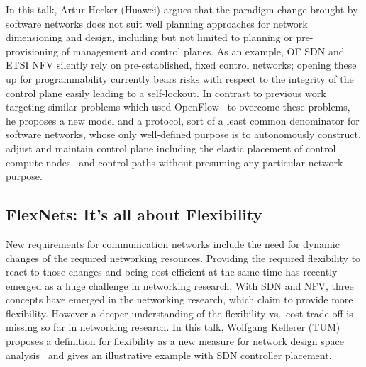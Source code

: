 In this talk, Artur Hecker (Huawei) argues that the paradigm change brought by
software networks does not suit well planning approaches for network
dimensioning and design, including but not limited to planning or
pre-provisioning of management and control planes. As an example, OF \ac{SDN}
and ETSI \ac{NFV} silently rely on pre-established, fixed control networks;
opening these up for programmability currently bears risks
\cite{lschiff:dsn:2016} with respect to the integrity of the control plane
easily leading to a self-lockout.  In contrast to previous work targeting
similar problems which used OpenFlow~\cite{lschiff:ccr:2016} to overcome these
problems, he proposes a new model and a protocol, sort of a least common
denominator for software networks, whose only well-defined purpose is to
autonomously construct, adjust and maintain control plane including the
elastic placement of control compute nodes~\cite{yliu:icc:2015} and control
paths without presuming any particular network purpose.

\subsection{FlexNets: It's all about Flexibility}

New requirements for communication networks include the need for dynamic
changes of the required networking resources. Providing the required
flexibility to react to those changes and being cost efficient at the same
time has recently emerged as a huge challenge in networking research. With
\ac{SDN} and \ac{NFV}, three concepts have emerged in the networking research,
which claim to provide more flexibility. However a deeper understanding of the
flexibility vs.\ cost trade-off is missing so far in networking research. In
this talk, Wolfgang Kellerer (TUM) proposes a definition for flexibility as a
new measure for network design space analysis~\cite{wkellerer:infocom:2016}
and gives an illustrative example with \ac{SDN} controller placement.

